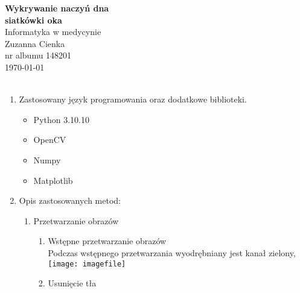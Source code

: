 \documentclass{article}
\begin{document}
\begin{center}\vspace{-1cm}
    \textbf{ \Huge Wykrywanie naczyń dna \\siatkówki oka}\\
    \LARGE Informatyka w medycynie\\
    \Large Zuzanna Cienka  \\
    \large nr albumu 148201\\
    \large \today \\~\\
\end{center}

\begin{enumerate}

    \item Zastosowany język programowania oraz dodatkowe biblioteki.
          \begin{itemize}
              \item Python 3.10.10
              \item OpenCV
              \item Numpy
              \item Matplotlib
          \end{itemize}
    \item Opis zastosowanych metod:
          \begin{enumerate}
              \item Przetwarzanie obrazów
              \begin{enumerate}
                \item Wstępne przetwarzanie obrazów\\
                Podczas wstępnego przetwarzania wyodrębniany jest kanał zielony,
                \texttt{[image: imagefile]}

                \item Usunięcie tła
              \end{enumerate}

          \end{enumerate}


\end{enumerate}
\end{document}
